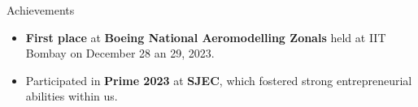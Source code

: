 \documentclass{resume} %
\begin{document}
\begin{rSection}{Achievements} 
    \begin{itemize}

        \item 	\textbf{First place} at \textbf{Boeing National Aeromodelling Zonals} held at IIT Bombay on December 28 an 29, 2023.
        
        \item Participated in \textbf{Prime 2023} at \textbf{SJEC}, which fostered strong entrepreneurial abilities within us.
    \end{itemize}
    
    
    \end{rSection}
\end{document}

